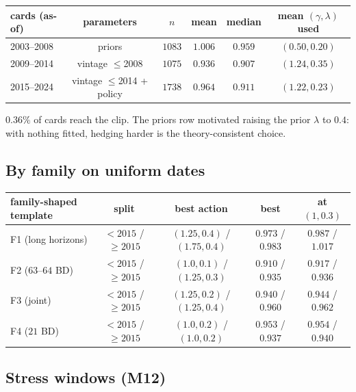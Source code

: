 \begin{center}
\begin{tabular}{lccccc}
\toprule
cards (as-of) & parameters & $n$ & mean & median & mean $(\gamma,\lambda)$ used\\
\midrule
2003--2008 & priors & $1083$ & $1.006$ & $0.959$ & $(0.50,0.20)$\\
2009--2014 & vintage $\le$2008 & $1075$ & $\mathbf{0.936}$ & $0.907$ & $(1.24,0.35)$\\
2015--2024 & vintage $\le$2014 + policy & $1738$ & $\mathbf{0.964}$ & $0.911$ & $(1.22,0.23)$\\
\bottomrule
\end{tabular}
\end{center}
$0.36\%$ of cards reach the clip. The priors row motivated raising the prior $\lambda$ to $0.4$: with nothing fitted, hedging harder is the
theory-consistent choice.

\subsection{By family on uniform dates}

\begin{center}
{\footnotesize\setlength{\tabcolsep}{3pt}\begin{tabular}{lcccc}
\toprule
family-shaped template & split & best action & best & at $(1,0.3)$\\
\midrule
F1 (long horizons) & $<2015$ / $\ge2015$ & $(1.25,0.4)$ / $(1.75,0.4)$ & $0.973$ / $0.983$ & $0.987$ / $1.017$\\
F2 ($63$--$64$ BD) & $<2015$ / $\ge2015$ & $(1.0,0.1)$ / $(1.25,0.3)$ & $0.910$ / $0.935$ & $0.917$ / $0.936$\\
F3 (joint) & $<2015$ / $\ge2015$ & $(1.25,0.2)$ / $(1.25,0.4)$ & $0.940$ / $0.960$ & $0.944$ / $0.962$\\
F4 ($21$ BD) & $<2015$ / $\ge2015$ & $(1.0,0.2)$ / $(1.0,0.2)$ & $0.953$ / $0.937$ & $0.954$ / $0.940$\\
\bottomrule
\end{tabular}}
\end{center}

\subsection{Stress windows (M12)}


